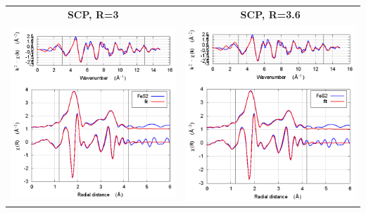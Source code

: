 \documentclass[11pt]{article}
\begin{document}
\begin{center}
  \begin{tabular}{cc}
    \textbf{SCP, R=3} & \textbf{SCP, R=3.6} \\ 
    \includegraphics[width=.45\linewidth]{FeS2/scf/fit_withSCF_3.png} & 
    \includegraphics[width=.45\linewidth]{FeS2/scf/fit_withSCF_3.6.png} \\
  \end{tabular}
\end{center}
\end{document}
